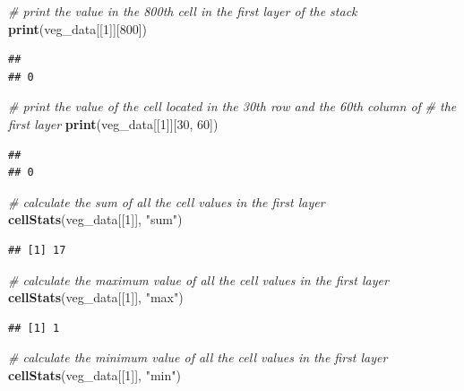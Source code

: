 \documentclass[
  12pt,
]{book}
\newenvironment{Shaded}{\begin{snugshade}}{\end{snugshade}}
\newcommand{\CommentTok}[1]{\textcolor[rgb]{0.56,0.35,0.01}{\textit{#1}}}
\newcommand{\DecValTok}[1]{\textcolor[rgb]{0.00,0.00,0.81}{#1}}
\newcommand{\KeywordTok}[1]{\textcolor[rgb]{0.13,0.29,0.53}{\textbf{#1}}}
\newcommand{\NormalTok}[1]{#1}
\newcommand{\StringTok}[1]{\textcolor[rgb]{0.31,0.60,0.02}{#1}}
\begin{document}
\begin{Shaded}
\begin{Highlighting}[]
\CommentTok{# print the value in the 800th cell in the first layer of the stack}
\KeywordTok{print}\NormalTok{(veg_data[[}\DecValTok{1}\NormalTok{]][}\DecValTok{800}\NormalTok{])}
\end{Highlighting}
\end{Shaded}

\begin{verbatim}
##   
## 0
\end{verbatim}

\begin{Shaded}
\begin{Highlighting}[]
\CommentTok{# print the value of the cell located in the 30th row and the 60th column of}
\CommentTok{# the first layer}
\KeywordTok{print}\NormalTok{(veg_data[[}\DecValTok{1}\NormalTok{]][}\DecValTok{30}\NormalTok{, }\DecValTok{60}\NormalTok{])}
\end{Highlighting}
\end{Shaded}

\begin{verbatim}
##   
## 0
\end{verbatim}

\begin{Shaded}
\begin{Highlighting}[]
\CommentTok{# calculate the sum of all the cell values in the first layer}
\KeywordTok{cellStats}\NormalTok{(veg_data[[}\DecValTok{1}\NormalTok{]], }\StringTok{"sum"}\NormalTok{)}
\end{Highlighting}
\end{Shaded}

\begin{verbatim}
## [1] 17
\end{verbatim}

\begin{Shaded}
\begin{Highlighting}[]
\CommentTok{# calculate the maximum value of all the cell values in the first layer}
\KeywordTok{cellStats}\NormalTok{(veg_data[[}\DecValTok{1}\NormalTok{]], }\StringTok{"max"}\NormalTok{)}
\end{Highlighting}
\end{Shaded}

\begin{verbatim}
## [1] 1
\end{verbatim}

\begin{Shaded}
\begin{Highlighting}[]
\CommentTok{# calculate the minimum value of all the cell values in the first layer}
\KeywordTok{cellStats}\NormalTok{(veg_data[[}\DecValTok{1}\NormalTok{]], }\StringTok{"min"}\NormalTok{)}
\end{Highlighting}
\end{Shaded}
\end{document}
